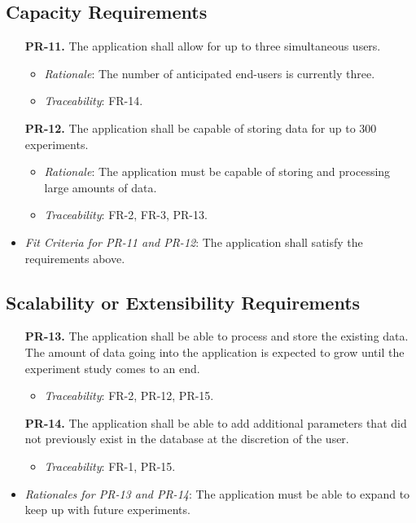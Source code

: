 \documentclass[12pt]{article}
\begin{document}
\subsection{Capacity Requirements}
\begin{enumerate}
  \item[\textbf{PR-11.}] The application shall allow for up to three simultaneous users.
    \begin{itemize}
      \item \textit{Rationale}: The number of anticipated end-users is currently three.
      \item \textit{Traceability}: FR-14.
    \end{itemize}
  \item[\textbf{PR-12.}] The application shall be capable of storing data for up to 300 experiments.
    \begin{itemize}
      \item \textit{Rationale}: The application must be capable of storing and processing large amounts of data.
      \item \textit{Traceability}: FR-2, FR-3, PR-13.
    \end{itemize}
\end{enumerate}
\begin{itemize}
  \item \textit{Fit Criteria for PR-11 and PR-12}: The application shall satisfy the requirements above.
\end{itemize}

\subsection{Scalability or Extensibility Requirements}
\begin{enumerate}
  \item[\textbf{PR-13.}] The application shall be able to process and store the existing data. The amount of data going into the application is expected to grow until the experiment study comes to an end.
    \begin{itemize}
      \item \textit{Traceability}: FR-2, PR-12, PR-15.
    \end{itemize}
  \item[\textbf{PR-14.}] The application shall be able to add additional parameters that did not previously exist in the database at the discretion of the user.
    \begin{itemize}
      \item \textit{Traceability}: FR-1, PR-15.
    \end{itemize}
\end{enumerate}
\begin{itemize}
  \item \textit{Rationales for PR-13 and PR-14}: The application must be able to expand to keep up with future experiments.
\end{itemize}
\end{document}
